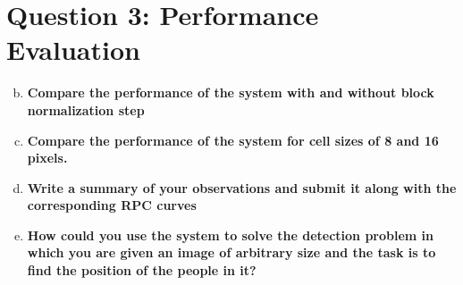 \documentclass[12pt]{article}
\begin{document}
\newpage
\section*{Question 3: Performance Evaluation}
\begin{enumerate}[a)]
	\setcounter{enumi}{1}
	\item 
        \textbf{Compare the performance of the system with and without block normalization step}\\

	\item 
        \textbf{Compare the performance of the system for cell sizes of 8 and 16 pixels.}\\

	\item
        \textbf{Write a summary of your observations and submit it along with the corresponding RPC curves}\\

	\item 
        \textbf{How could you use the system to solve the detection problem in which you are given an image of arbitrary size and the task is to find the position of the people in it?}\\

\end{enumerate}
\end{document}
